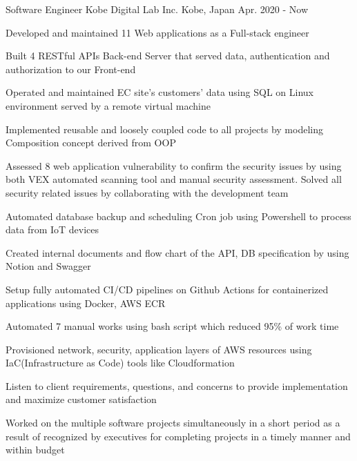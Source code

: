 

\begin{cventries}


  \cventry
    {Software Engineer} %
    {Kobe Digital Lab Inc.} %
    {Kobe, Japan} %
    {Apr. 2020 - Now} %
    {
      \begin{cvitems} %
        \item {Developed and maintained 11 Web applications as a Full-stack engineer}
        \item {Built 4 RESTful APIs Back-end Server that served data, authentication and authorization to our Front-end}
        \item {Operated and maintained EC site's customers' data using SQL on Linux environment served by a remote virtual machine}
        \item {Implemented reusable and loosely coupled code to all projects by modeling Composition concept derived from OOP}
        \item {Assessed 8 web application vulnerability to confirm the security issues by using both VEX automated scanning tool and manual security assessment. Solved all security related issues by collaborating with the development team}
        \item {Automated database backup and scheduling Cron job using Powershell to process data from IoT devices}
        \item {Created internal documents and flow chart of the API, DB specification by using Notion and Swagger}
        \item {Setup fully automated CI/CD pipelines on Github Actions for containerized applications using Docker, AWS ECR}
        \item {Automated 7 manual works using bash script which reduced 95\% of work time}
        \item {Provisioned network, security, application layers of AWS resources using IaC(Infrastructure as Code) tools like Cloudformation}
        \item {Listen to client requirements, questions, and concerns to provide implementation and maximize customer satisfaction}
        \item {Worked on the multiple software projects simultaneously in a short period as a result of recognized by executives for completing projects in a timely manner and within budget}
      \end{cvitems}
}


\end{cventries}
